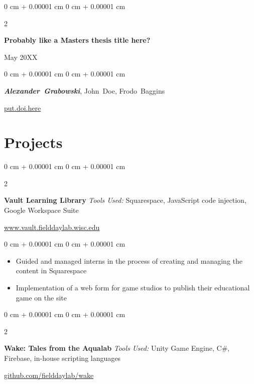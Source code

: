 \documentclass[10pt, letterpaper]{article}
\newenvironment{highlights}{
    \begin{itemize}[
        topsep=0.10 cm,
        parsep=0.10 cm,
        partopsep=0pt,
        itemsep=0pt,
        leftmargin=0 cm + 10pt
    ]
}{
    \end{itemize}
} %
\newenvironment{onecolentry}{
    \begin{adjustwidth}{
        0 cm + 0.00001 cm
    }{
        0 cm + 0.00001 cm
    }
}{
    \end{adjustwidth}
} %
\newenvironment{twocolentry}[2][]{
    \onecolentry
    \def\secondColumn{#2}
    \setcolumnwidth{\fill, 4.5 cm}
    \begin{paracol}{2}
}{
    \switchcolumn \raggedleft \secondColumn
    \end{paracol}
    \endonecolentry
} %
\begin{document}
        \begin{samepage}
            \begin{twocolentry}{
                May 20XX
            }
                \textbf{Probably like a Masters thesis title here?}
            \end{twocolentry}

            \vspace{0.10 cm}
            
            \begin{onecolentry}
                \mbox{\textbf{\textit{Alexander Grabowski}}}, \mbox{John Doe}, \mbox{Frodo Baggins}

                \vspace{0.10 cm}
                
        \href{https://doi.org/here}{put.doi.here}
        \end{onecolentry}
        \end{samepage}
    
    \section{Projects}
        \begin{twocolentry}
        {
            \href{https://www.vault.fielddaylab.wisc.edu/}{www.vault.fielddaylab.wisc.edu}
        }   
        \textbf{Vault Learning Library} \newline
            \hspace{0.2 cm} \textit{Tools Used:} Squarespace, JavaScript code injection, Google Workspace Suite
        \end{twocolentry}

        \vspace{0.10 cm}
        \begin{onecolentry}
            \begin{highlights}
                \item Guided and managed interns in the process of creating and managing the content in Squarespace 
                \item Implementation of a web form for game studios to publish their educational game on the site
            \end{highlights}
        \end{onecolentry}

        \vspace{0.2 cm}

        \begin{twocolentry}
        {
            \href{https://github.com/fielddaylab/wake}{github.com/fielddaylab/wake}
        }   
        \textbf{Wake: Tales from the Aqualab} \newline
            \hspace{0.2 cm} \textit{Tools Used:} Unity Game Engine, C\#, Firebase, in-house scripting languages
        \end{twocolentry}
\end{document}
